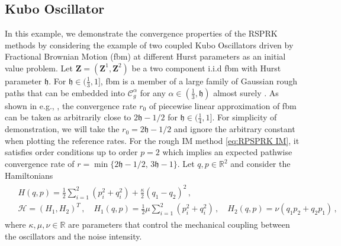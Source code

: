 \documentclass[11pt, oneside]{article}
\numberwithin{equation}{section}
\theoremstyle{definition}
\newcommand{\mc}[1]{\mathcal{#1}}
\newcommand{\mcal}[1]{\mc{#1}}
\begin{document}
\subsection{Kubo Oscillator}
In this example, we demonstrate the convergence properties of the RSPRK methods by considering the example of two coupled Kubo Oscillators driven by Fractional Brownian Motion (fbm) at different Hurst parameters as an initial value problem. Let $\mathbf{Z} = (\mathbf{Z}^1, \mathbf{Z}^2)$ be a two component i.i.d fbm with Hurst parameter $\mathfrak{h}$. For $\mathfrak{h} \in (\frac{1}{3}, 1]$, fbm is a member of a large family of Gaussian rough paths that can be embedded into $\mcal{C}^\alpha_g$ for any $\alpha \in (\frac{1}{3}, \mathfrak{h})$ almost surely \cite{FV10}. As shown in e.g., \cite{FR2014}, the convergence rate $r_0$ of piecewise linear approximation of fbm can be taken as arbitrarily close to $2\mathfrak{h} - 1/2$ for $\mathfrak{h} \in (\frac{1}{4}, 1]$. For simplicity of demonstration, we will take the $r_0 = 2\mathfrak{h} - 1/2$ and ignore the arbitrary constant when plotting the reference rates. For the rough IM method \eqref{eq:RPSPRK IM}, it satisfies order conditions up to order $p=2$ which implies an expected pathwise convergence rate of $r = \min\{2\mathfrak{h} - 1/2,\, 3\mathfrak{h}-1\}$. Let $q, p \in \mathbb{R}^2$ and consider the Hamiltonians  
\begin{align}
    \begin{split}
        &H(q,p) = \frac{1}{2}\sum_{i=1}^2\left(p_i^2 + q_i^2\right) + \frac{\kappa}{2}\left(q_1 - q_2\right)^2 \,,\\
        &\mcal{H} = \left(H_1, H_2\right)^T\,,\quad H_1(q,p) = \frac{1}{2}\mu\sum_{i=1}^2\left(p_i^2 + q_i^2\right) \,,\quad H_2(q,p) = \nu \left(q_1p_2 + q_2p_1\right)\,,
    \end{split}
\end{align}
where $\kappa, \mu, \nu \in \mathbb{R}$ are parameters that control the mechanical coupling between the oscillators and the noise intensity.
\end{document}
